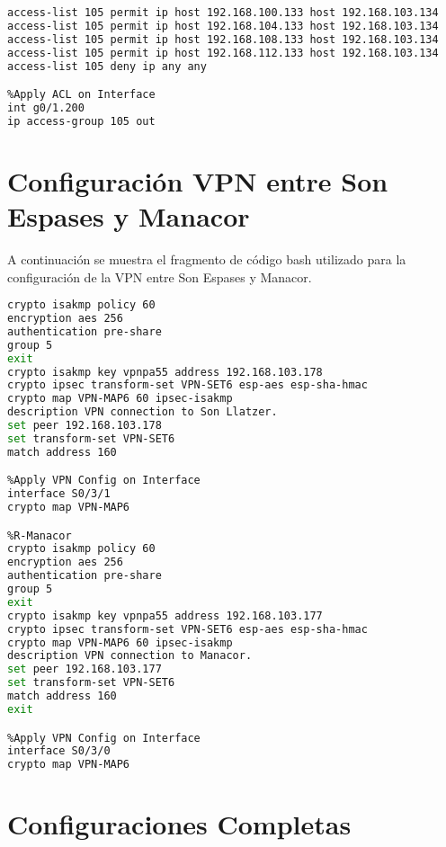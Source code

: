 \begin{lstlisting}[language=Bash, caption={Configuración ACLs Routers Interconexión}]
%Declare ACL to Block Access to File Server
access-list 105 permit ip host 192.168.100.133 host 192.168.103.134
access-list 105 permit ip host 192.168.104.133 host 192.168.103.134
access-list 105 permit ip host 192.168.108.133 host 192.168.103.134
access-list 105 permit ip host 192.168.112.133 host 192.168.103.134
access-list 105 deny ip any any

%Apply ACL on Interface
int g0/1.200
ip access-group 105 out
\end{lstlisting}

\section{Configuración VPN entre Son Espases y Manacor}\label{anexo:vpn}
A continuación se muestra el fragmento de código bash utilizado para la configuración de la VPN entre Son Espases y Manacor.

\begin{lstlisting}[language=Bash, caption={Configuración VPN entre Son Espases y Manacor}]
%R-Son_Espases
crypto isakmp policy 60
encryption aes 256
authentication pre-share
group 5
exit
crypto isakmp key vpnpa55 address 192.168.103.178
crypto ipsec transform-set VPN-SET6 esp-aes esp-sha-hmac
crypto map VPN-MAP6 60 ipsec-isakmp
description VPN connection to Son Llatzer.
set peer 192.168.103.178
set transform-set VPN-SET6
match address 160

%Apply VPN Config on Interface
interface S0/3/1
crypto map VPN-MAP6

%R-Manacor
crypto isakmp policy 60
encryption aes 256
authentication pre-share
group 5
exit
crypto isakmp key vpnpa55 address 192.168.103.177
crypto ipsec transform-set VPN-SET6 esp-aes esp-sha-hmac
crypto map VPN-MAP6 60 ipsec-isakmp
description VPN connection to Manacor.
set peer 192.168.103.177
set transform-set VPN-SET6
match address 160
exit

%Apply VPN Config on Interface
interface S0/3/0
crypto map VPN-MAP6
\end{lstlisting}

\section{Configuraciones Completas}\label{anexo:conf}
